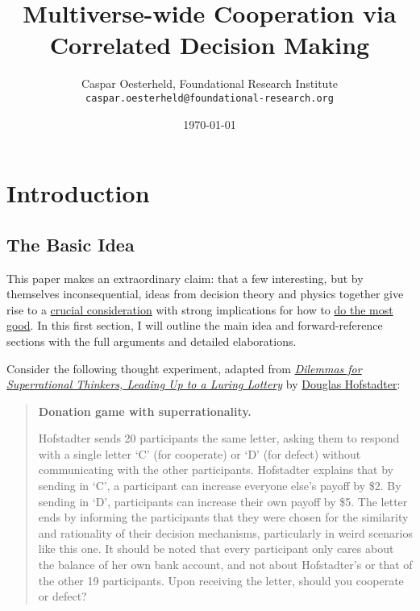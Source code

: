 \documentclass{book}
\title{Multiverse-wide Cooperation via Correlated Decision Making}
\author {Caspar Oesterheld, Foundational Research Institute\\\texttt{caspar.oesterheld@foundational-research.org}}
\date{\today}
\begin{document}
\maketitle    %



\newpage

\tableofcontents

\chapter{Introduction}
\label{Introduction}
\section{The Basic Idea}
\label{basicidea}

This paper makes an extraordinary claim: that a few interesting, but by themselves inconsequential, ideas from decision theory and physics together give rise to a \href{https://casparoesterheld.files.wordpress.com/2016/11/crucialconsiderations1.pdf}{crucial consideration} with strong implications for how to \href{https://en.wikipedia.org/wiki/Effective_altruism}{do the most good}. In this first section, I will outline the main idea and forward-reference sections with the full arguments and detailed elaborations.

Consider the following thought experiment, adapted from \href{https://www.gwern.net/docs/1985-hofstadter#dilemmas-for-superrational-thinkers-leading-up-to-a-luring-lottery}{\textit{Dilemmas for Superrational Thinkers, Leading Up to a Luring Lottery}} by \href{https://en.wikipedia.org/wiki/Douglas_Hofstadter}{Douglas Hofstadter}:

\begin{quote}
\hypertarget{donationgame}{\textbf{Donation game with superrationality.}} Hofstadter sends 20 participants the same letter, asking them to respond with a single letter ‘C’ (for cooperate) or ‘D’ (for defect) without communicating with the other participants. Hofstadter explains that by sending in ‘C’, a participant can increase everyone else’s payoff by \$2. By sending in ‘D’, participants can increase their own payoff by \$5. The letter ends by informing the participants that they were chosen for the similarity and rationality of their decision mechanisms, particularly in weird scenarios like this one. It should be noted that every participant only cares about the balance of her own bank account, and not about Hofstadter’s or that of the other 19 participants. Upon receiving the letter, should you cooperate or defect?
\end{quote}
\end{document}

